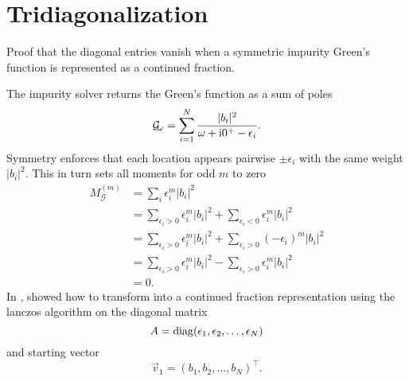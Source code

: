 \chapter{Tridiagonalization}

Proof that the diagonal entries vanish when a symmetric impurity Green's function
is represented as a continued fraction.

The impurity solver returns the Green's function as a sum of poles
\begin{align}
    \mathcal{G}_{\!\omega} = \sum_{i=1}^N \frac{|b_i|^2}{\omega + \mathrm{i}0^+ - \epsilon_i}.
    \label{eq:impurity-greens-function}
\end{align}
Symmetry enforces that each location appears pairwise $\pm\epsilon_i$
with the same weight $|b_i|^2$.
This in turn sets all moments for odd $m$ to zero 
\begin{align}
    M^{(m)}_{\mathcal{G}}
     & =
    \sum_i \epsilon_i^m |b_i|^2                                                            \\
     & =
    \sum_{\epsilon_i>0} \epsilon_i^m |b_i|^2 + \sum_{\epsilon_i<0} \epsilon_i^m |b_i|^2    \\
     & =
    \sum_{\epsilon_i>0} \epsilon_i^m |b_i|^2 + \sum_{\epsilon_i>0} (-\epsilon_i)^m |b_i|^2 \\
     & =
    \sum_{\epsilon_i>0} \epsilon_i^m |b_i|^2 - \sum_{\epsilon_i>0} \epsilon_i^m |b_i|^2    \\
     & =
    0.
\end{align}
In \cite[appendix B]{Lu2014}, \citeauthor{Lu2014} showed how to transform
 into a continued fraction representation
using the lanczos algorithm on the diagonal matrix
\begin{equation}
    A
    =
    \operatorname{diag}(\epsilon_1, \epsilon_2, \ldots, \epsilon_N)
\end{equation}
and starting vector
\begin{equation}
    \vec{v}_1 = (b_1, b_2, \ldots, b_N)^\intercal.
\end{equation}

